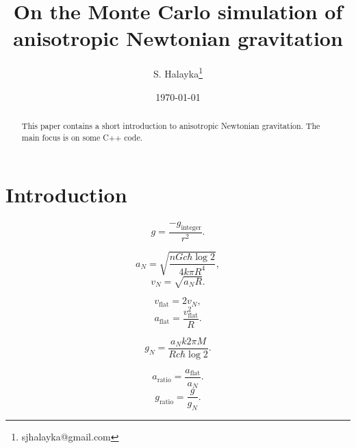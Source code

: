 \documentclass[12pt]{article}
\title{On the Monte Carlo simulation of anisotropic Newtonian gravitation}
\author{S. Halayka\footnote{sjhalayka@gmail.com}}
\date{\today\;\currenttime}
\begin{document}
 
\maketitle

\begin{abstract}
This paper contains a short introduction to anisotropic Newtonian gravitation.
The main focus is on some C++ code.
\end{abstract}




\section{Introduction}
\begin{equation}
g = \frac{-g_{\textrm{integer}}}{r^2}. 
\end{equation}

\begin{equation}
a_N = \sqrt{\frac{n G c \hbar \log 2}{4 k \pi R^4}},
\end{equation}
\begin{equation}
v_N = \sqrt{a_N R}.
\end{equation}

\begin{equation}
v_{\textrm{flat}} = 2 v_N,
\end{equation}
\begin{equation}
a_{\textrm{flat}} = \frac{v_{\textrm{flat}}^2}{R}.
\end{equation}

\begin{equation}
g_N = \frac{a_N k 2 \pi M}{R c \hbar \log 2}. 
\end{equation}

\begin{equation}
a_{\textrm{ratio}} = \frac{a_{\textrm{flat}}}{a_N}. 
\end{equation}
\begin{equation}
g_{\textrm{ratio}} = \frac{g}{g_N}. 
\end{equation}
\end{document}
